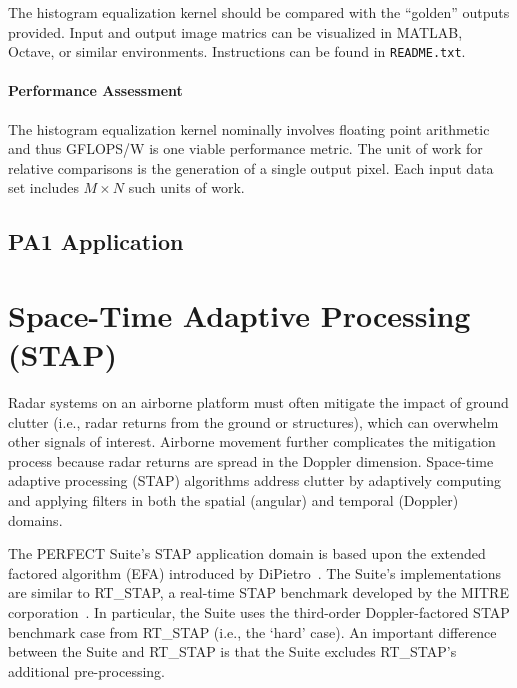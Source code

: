 \documentclass{report}
\begin{document}
The histogram equalization kernel should be compared with the ``golden'' outputs provided.
Input and output image matrics can be visualized in MATLAB, Octave, or similar
environments.  Instructions can be found in \texttt{README.txt}.

\subsubsection{Performance Assessment}

The histogram equalization kernel nominally involves floating point arithmetic and
thus GFLOPS/W is one viable performance metric.
The unit of work for relative comparisons is the generation of a single
output pixel.
Each input data set includes $M \times N$ such units of work.



\section{PA1 Application}
\label{sec:app1:app}



\chapter{Space-Time Adaptive Processing (STAP)}

Radar systems on an airborne platform must often mitigate the impact
of ground clutter (i.e., radar returns from the ground or structures), which can overwhelm other signals of interest.
Airborne movement further complicates the mitigation process because radar returns are spread in the Doppler dimension.
Space-time adaptive processing (STAP) algorithms address clutter by
adaptively computing and applying filters in both the spatial
(angular) and temporal (Doppler) domains.

The PERFECT Suite's STAP application domain is based upon the extended factored algorithm (EFA) introduced by DiPietro~\cite{DiPietro1992}.
The Suite's implementations are similar to RT\_STAP, a real-time STAP benchmark developed by the MITRE corporation~\cite{RT_STAP}.
In particular, the Suite uses the third-order Doppler-factored STAP benchmark case from RT\_STAP (i.e., the `hard' case).
An important difference between the Suite and RT\_STAP is that the Suite
excludes RT\_STAP's additional pre-processing.
\end{document}
